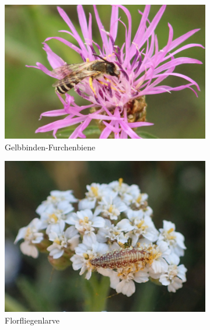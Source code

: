 \documentclass[11pt]{article}
\begin{document}
\begin{figure}[h!]
  \centering
  \begin{subfigure}[b]{0.47\linewidth}
    \includegraphics[width=\linewidth]{img/bogen/wildbiene.jpg}
    \caption{Gelbbinden-Furchenbiene}
  \end{subfigure}
  \begin{subfigure}[b]{0.42\linewidth}
    \includegraphics[width=\linewidth]{img/bogen/florfliegenlarve.jpg}
    \caption{Florfliegenlarve}
  \end{subfigure}
  \begin{subfigure}[b]{0.44\linewidth}

\end{subfigure}
\end{figure}
\end{document}
